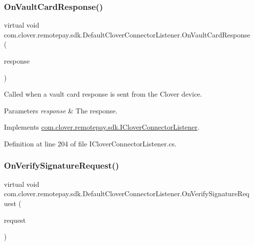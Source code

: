 \subsubsection{\texorpdfstring{On\+Vault\+Card\+Response()}{OnVaultCardResponse()}}
{\footnotesize\ttfamily virtual void com.\+clover.\+remotepay.\+sdk.\+Default\+Clover\+Connector\+Listener.\+On\+Vault\+Card\+Response (\begin{DoxyParamCaption}\item[{\hyperlink{classcom_1_1clover_1_1remotepay_1_1sdk_1_1_vault_card_response}{Vault\+Card\+Response}}]{response }\end{DoxyParamCaption})\hspace{0.3cm}{\ttfamily [virtual]}}



Called when a vault card response is sent from the Clover device. 


\begin{DoxyParams}{Parameters}
{\em response} & The response.\\
\hline
\end{DoxyParams}


Implements \hyperlink{interfacecom_1_1clover_1_1remotepay_1_1sdk_1_1_i_clover_connector_listener_a1abb7953534d225a8f6a2e9c43dac34e}{com.\+clover.\+remotepay.\+sdk.\+I\+Clover\+Connector\+Listener}.



Definition at line 204 of file I\+Clover\+Connector\+Listener.\+cs.

\mbox{\label{classcom_1_1clover_1_1remotepay_1_1sdk_1_1_default_clover_connector_listener_a730846aaee619b9c0c6bf737ef4ff5e2}} 
\subsubsection{\texorpdfstring{On\+Verify\+Signature\+Request()}{OnVerifySignatureRequest()}}
{\footnotesize\ttfamily virtual void com.\+clover.\+remotepay.\+sdk.\+Default\+Clover\+Connector\+Listener.\+On\+Verify\+Signature\+Request (\begin{DoxyParamCaption}\item[{\hyperlink{classcom_1_1clover_1_1remotepay_1_1sdk_1_1_verify_signature_request}{Verify\+Signature\+Request}}]{request }\end{DoxyParamCaption})\hspace{0.3cm}{\ttfamily [virtual]}}



